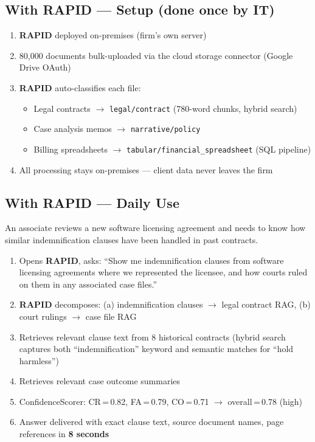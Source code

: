 \documentclass[12pt, a4paper, oneside]{report}
\newcommand{\kw}[1]{\texttt{\small #1}}
\newcommand{\rapidsys}{\textbf{\color{rapidblue}RAPID}}
\begin{document}
\subsection*{With RAPID — Setup (done once by IT)}
\begin{enumerate}
  \item \rapidsys{} deployed on-premises (firm's own server)
  \item 80,000 documents bulk-uploaded via the cloud storage connector (Google Drive OAuth)
  \item \rapidsys{} auto-classifies each file:
        \begin{itemize}
          \item Legal contracts $\to$ \kw{legal/contract} (780-word chunks, hybrid search)
          \item Case analysis memos $\to$ \kw{narrative/policy}
          \item Billing spreadsheets $\to$ \kw{tabular/financial\_spreadsheet} (SQL pipeline)
        \end{itemize}
  \item All processing stays on-premises — client data never leaves the firm
\end{enumerate}

\subsection*{With RAPID — Daily Use}
An associate reviews a new software licensing agreement and needs to know how similar
indemnification clauses have been handled in past contracts.

\begin{enumerate}
  \item Opens \rapidsys{}, asks: ``Show me indemnification clauses from software licensing
        agreements where we represented the licensee, and how courts ruled on them in any
        associated case files.''
  \item \rapidsys{} decomposes: (a) indemnification clauses $\to$ legal contract RAG,
        (b) court rulings $\to$ case file RAG
  \item Retrieves relevant clause text from 8 historical contracts (hybrid search captures
        both ``indemnification'' keyword and semantic matches for ``hold harmless'')
  \item Retrieves relevant case outcome summaries
  \item ConfidenceScorer: CR\,=\,0.82, FA\,=\,0.79, CO\,=\,0.71 $\to$ overall\,=\,0.78 (high)
  \item Answer delivered with exact clause text, source document names, page references in \textbf{8 seconds}
\end{enumerate}
\end{document}
